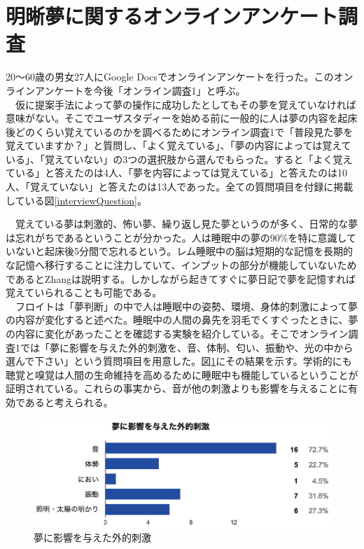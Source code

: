 \section{明晰夢に関するオンラインアンケート調査}
20〜60歳の男女27人にGoogle Docsでオンラインアンケートを行った。このオンラインアンケートを今後「オンライン調査1」と呼ぶ。\\
　仮に提案手法によって夢の操作に成功したとしてもその夢を覚えていなければ意味がない。そこでユーザスタディーを始める前に一般的に人は夢の内容を起床後どのくらい覚えているのかを調べるためにオンライン調査1で「普段見た夢を覚えていますか？」と質問し、「よく覚えている」、「夢の内容によっては覚えている」、「覚えていない」の3つの選択肢から選んでもらった。すると「よく覚えている」と答えたのは4人、「夢を内容によっては覚えている」と答えたのは10人、「覚えていない」と答えたのは13人であった。全ての質問項目を付録に掲載している図\ref{interviewQuestion}。

　覚えている夢は刺激的、怖い夢、繰り返し見た夢というのが多く、日常的な夢は忘れがちであるということが分かった。人は睡眠中の夢の90\%を特に意識していないと起床後5分間で忘れるという。レム睡眠中の脳は短期的な記憶を長期的な記憶へ移行することに注力していて、インプットの部分が機能していないためであるとZhangは説明する\cite{Zhang}。しかしながら起きてすぐに夢日記で夢を記憶すれば覚えていられることも可能である\cite{forgetDreams}。\\
　フロイトは「夢判断」の中で人は睡眠中の姿勢、環境、身体的刺激によって夢の内容が変化すると述べた\cite{freud}。睡眠中の人間の鼻先を羽毛でくすぐったときに、夢の内容に変化があったことを確認する実験を紹介している。そこでオンライン調査1では「夢に影響を与えた外的刺激を、音、体制、匂い、振動や、光の中から選んで下さい」という質問項目を用意した。図\ref{externalShigeki}にその結果を示す。学術的にも聴覚と嗅覚は人間の生命維持を高めるために睡眠中も機能しているということが証明されている\cite{Zhang}。これらの事実から、音が他の刺激よりも影響を与えることに有効であると考えられる。\\

\begin{figure}[htbp]
\begin{center}
\includegraphics[width=15cm]{eps/input.eps}
\caption{夢に影響を与えた外的刺激}
\label{externalShigeki}
\end{center}
\end{figure}

